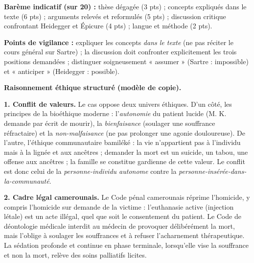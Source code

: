 \documentclass[11pt]{article}
\begin{document}
\begin{corrige}
\textbf{Barème indicatif (sur 20) :} thèse dégagée (3 pts) ; concepts expliqués dans le texte (6 pts) ; arguments relevés et reformulés (5 pts) ; discussion critique confrontant Heidegger et Épicure (4 pts) ; langue et méthode (2 pts).

\textbf{Points de vigilance :} expliquer les concepts \emph{dans le texte} (ne pas réciter le cours général sur Sartre) ; la discussion doit confronter explicitement les trois positions demandées ; distinguer soigneusement « assumer » (Sartre : impossible) et « anticiper » (Heidegger : possible).
\end{corrige}

\begin{corrige}
\textbf{Raisonnement éthique structuré (modèle de copie).}

\textbf{1. Conflit de valeurs.} Le cas oppose deux univers éthiques. D'un côté, les principes de la bioéthique moderne : l'\emph{autonomie} du patient lucide (M. K. demande par écrit de mourir), la \emph{bienfaisance} (soulager une souffrance réfractaire) et la \emph{non-malfaisance} (ne pas prolonger une agonie douloureuse). De l'autre, l'éthique communautaire bamiléké : la vie n'appartient pas à l'individu mais à la lignée et aux ancêtres ; demander la mort est un suicide, un tabou, une offense aux ancêtres ; la famille se constitue gardienne de cette valeur. Le conflit est donc celui de la \emph{personne-individu autonome} contre la \emph{personne-insérée-dans-la-communauté}.

\textbf{2. Cadre légal camerounais.} Le Code pénal camerounais réprime l'homicide, y compris l'homicide sur demande de la victime : l'euthanasie active (injection létale) est un acte illégal, quel que soit le consentement du patient. Le Code de déontologie médicale interdit au médecin de provoquer délibérément la mort, mais l'oblige à soulager les souffrances et à refuser l'acharnement thérapeutique. La sédation profonde et continue en phase terminale, lorsqu'elle vise la souffrance et non la mort, relève des soins palliatifs licites.


\end{corrige}
\end{document}
